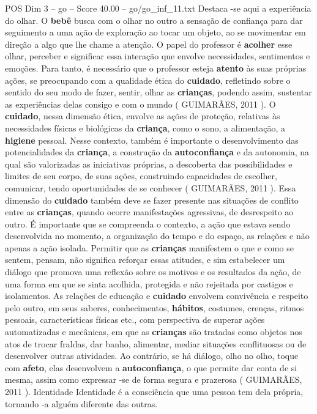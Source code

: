 \begin{textsample}{POS Dim 3 – go – Score 40.00 – go/go\_inf\_11.txt}
Destaca -se aqui a experiência do olhar.
O \textbf{bebê} busca com o olhar no outro a sensação de confiança para dar seguimento a uma ação de exploração ao tocar um objeto, ao se movimentar em direção a algo que lhe chame a atenção.
O papel do professor é \textbf{acolher} esse olhar, perceber e significar essa interação que envolve necessidades, sentimentos e emoções.
Para tanto, é necessário que o professor esteja \textbf{atento} às suas próprias ações, se preocupando com a qualidade ética do \textbf{cuidado}, refletindo sobre o sentido do seu modo de fazer, sentir, olhar as \textbf{crianças}, podendo assim, sustentar as experiências delas consigo e com o mundo ( GUIMARÃES, 2011 ).
O \textbf{cuidado}, nessa dimensão ética, envolve as ações de proteção, relativas às necessidades físicas e biológicas da \textbf{criança}, como o sono, a alimentação, a \textbf{higiene} pessoal.
Nesse contexto, também é importante o desenvolvimento das potencialidades da \textbf{criança}, a construção da \textbf{autoconfiança} e da autonomia, na qual são valorizadas as iniciativas próprias, a descoberta das possibilidades e limites de seu corpo, de suas ações, construindo capacidades de escolher, comunicar, tendo oportunidades de se conhecer ( GUIMARÃES, 2011 ).
Essa dimensão do \textbf{cuidado} também deve se fazer presente nas situações de conflito entre as \textbf{crianças}, quando ocorre manifestações agressivas, de desrespeito ao outro.
É importante que se compreenda o contexto, a ação que estava sendo desenvolvida no momento, a organização do tempo e do espaço, as relações e não apenas a ação isolada.
Permitir que as \textbf{crianças} manifestem o que e como se sentem, pensam, não significa reforçar essas atitudes, e sim estabelecer um diálogo que promova uma reflexão sobre os motivos e os resultados da ação, de uma forma em que se sinta acolhida, protegida e não rejeitada por castigos e isolamentos.
As relações de educação e \textbf{cuidado} envolvem convivência e respeito pelo outro, em seus saberes, conhecimentos, \textbf{hábitos}, costumes, crenças, ritmos pessoais, características físicas etc., com perspectiva de superar ações automatizadas e mecânicas, em que as \textbf{crianças} são tratadas como objetos nos atos de trocar fraldas, dar banho, alimentar, mediar situações conflituosas ou de desenvolver outras atividades.
Ao contrário, se há diálogo, olho no olho, toque com \textbf{afeto}, elas desenvolvem a \textbf{autoconfiança}, o que permite dar conta de si mesma, assim como expressar -se de forma segura e prazerosa ( GUIMARÃES, 2011 ).
Identidade Identidade é a consciência que uma pessoa tem dela própria, tornando -a alguém diferente das outras.

\end{textsample}
